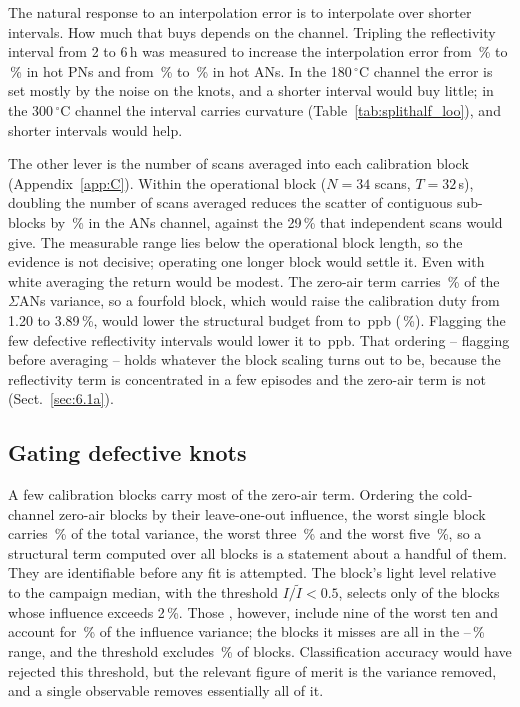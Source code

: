 The natural response to an interpolation error is to interpolate over shorter
intervals. How much that buys depends on the channel. Tripling the reflectivity interval from 2 to 6\,h was
measured to increase the interpolation error from \,\% to \,\% in hot PNs and from \,\% to
\,\% in hot ANs. In the 180\,$^{\circ}$C channel the error is set mostly by the noise on the knots, and a
shorter interval would buy little; in the 300\,$^{\circ}$C channel the interval carries curvature (Table~\ref{tab:splithalf_loo}),
and shorter intervals would help.

The other lever is the number of scans averaged into each calibration block (Appendix~\ref{app:C}). Within the operational block ($N = 34$ scans, $T = 32$\,s), doubling the number of
scans averaged reduces the scatter of contiguous sub-blocks by \,\% in the ANs channel, against the 29\,\% that
independent scans would give. The measurable range lies below the operational block length, so the evidence is not decisive;
operating one longer block would settle it. Even with white averaging the return would be modest. The zero-air term carries
\,\% of the $\Sigma$ANs variance, so a fourfold block, which would raise the calibration duty from 1.20 to 3.89\,\%,
would lower the structural budget from  to \,ppb (\,\%). Flagging the few defective
reflectivity intervals would lower it to \,ppb. That ordering -- flagging before averaging --
holds whatever the block scaling turns out to be, because the reflectivity term is concentrated in a few episodes and
the zero-air term is not (Sect.~\ref{sec:6.1a}).

\subsection{Gating defective knots}
\label{sec:6.3}

A few calibration blocks carry most of the zero-air term. Ordering the cold-channel zero-air blocks by their
leave-one-out influence, the worst single block carries \,\% of the total variance, the worst three \,\% and the worst
five \,\%, so a structural term computed over all blocks is a statement about a handful of them. They are identifiable
before any fit is attempted. The block's light level relative to the campaign median, with the threshold
$I/\tilde{I} < 0.5$, selects only  of the  blocks whose influence exceeds 2\,\%. Those , however, include nine of
the worst ten and account for \,\% of the influence variance; the  blocks it misses are all in the
--\,\% range, and the threshold excludes \,\% of blocks. Classification accuracy would have rejected this threshold, but the relevant
figure of merit is the variance removed, and a single observable removes essentially all of it.

